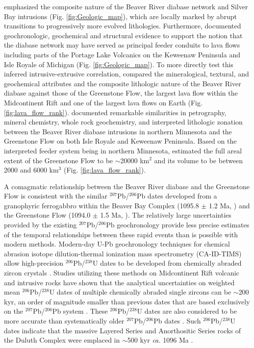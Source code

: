  emphasized the composite nature of the Beaver River diabase network and Silver Bay intrusions (Fig. \ref{fig:Geologic_map}), which are locally marked by abrupt transitions to progressively more evolved lithologies. Furthermore,  documented geochronologic, geochemical and structural evidence to support the notion that the diabase network may have served as principal feeder conduits to lava flows including parts of the Portage Lake Volcanics on the Keweenaw Peninsula and Isle Royale of Michigan (Fig. \ref{fig:Geologic_map}). To more directly test this inferred intrusive-extrusive correlation,  compared the mineralogical, textural, and geochemical attributes and the composite lithologic nature of the Beaver River diabase against those of the Greenstone Flow, the largest lava flow within the Midcontinent Rift and one of the largest lava flows on Earth (Fig. \ref{fig:lava_flow_rank}).  documented remarkable similarities in petrography, mineral chemistry, whole rock geochemistry, and interpreted lithologic zonation between the Beaver River diabase intrusions in northern Minnesota and the Greenstone Flow on both Isle Royale and Keweenaw Peninsula. Based on the interpreted feeder system being in northern Minnesota,  estimated the full areal extent of the Greenstone Flow to be $\sim$20000 km$^2$ and its volume to be between 2000 and 6000 km$^3$ (Fig. \ref{fig:lava_flow_rank}). 

A comagmatic relationship between the Beaver River diabase and the Greenstone Flow is consistent with the similar $^{207}$Pb/$^{206}$Pb dates developed from a granophyric ferrogabbro within the Beaver Bay Complex (1095.8 $\pm$ 1.2 Ma, ) and the Greenstone Flow (1094.0 $\pm$ 1.5 Ma, ). The relatively large uncertainties provided by the existing $^{207}$Pb/$^{206}$Pb geochronology provide less precise estimates of the temporal relationships between these rapid events than is possible with modern methods. Modern-day U-Pb geochronology techniques for chemical abrasion isotope dilution-thermal ionization mass spectrometry (CA-ID-TIMS) allow high-precision $^{206}$Pb/$^{238}$U dates to be developed from chemically abraded zircon crystals \cite{Mattinson2005a}. Studies utilizing these methods on Midcontinent Rift volcanic and intrusive rocks have shown that the analytical uncertainties on weighted mean $^{206}$Pb/$^{238}$U dates of multiple chemically abraded single zircons can be $\sim$200 kyr, an order of magnitude smaller than previous dates that are based exclusively on the $^{207}$Pb/$^{206}$Pb system \cite{Fairchild2017a, Swanson-Hysell2019a, Swanson-Hysell2020a}. These $^{206}$Pb/$^{238}$U dates are also considered to be more accurate than systematically older $^{207}$Pb/$^{206}$Pb dates \cite{Schoene2006a}. Such $^{206}$Pb/$^{238}$U dates indicate that the massive Layered Series and Anorthositic Series rocks of the Duluth Complex were emplaced in $\sim$500 kyr \textit{ca.} 1096 Ma \cite{Swanson-Hysell2020a}.  

